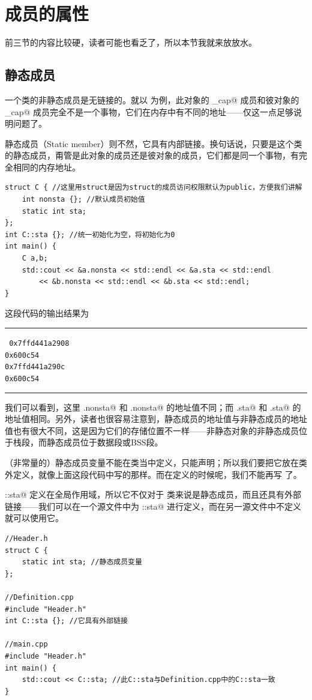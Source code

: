 \section{成员的属性}
前三节的内容比较硬，读者可能也看乏了，所以本节我就来放放水。\par
\subsection*{静态成员}
一个类的非静态成员是无链接的。就以 \lstinline@valarri@ 为例，此对象的 \lstinline@_cap@ 成员和彼对象的 \lstinline@_cap@ 成员完全不是一个事物，它们在内存中有不同的地址——仅这一点足够说明问题了。\par
静态成员（Static member）则不然，它具有内部链接。换句话说，只要是这个类的静态成员，甭管是此对象的成员还是彼对象的成员，它们都是同一个事物，有完全相同的内存地址。
\begin{lstlisting}
struct C { //这里用struct是因为struct的成员访问权限默认为public，方便我们讲解
    int nonsta {}; //默认成员初始值
    static int sta;
};
int C::sta {}; //统一初始化为空，将初始化为0
int main() {
    C a,b;
    std::cout << &a.nonsta << std::endl << &a.sta << std::endl
        << &b.nonsta << std::endl << &b.sta << std::endl;
}
\end{lstlisting}
这段代码的输出结果为\\\noindent\rule{\linewidth}{.2pt}\texttt{
0x7ffd441a2908\\
0x600c54\\
0x7ffd441a290c\\
0x600c54
}\\\noindent\rule{\linewidth}{.2pt}
我们可以看到，这里 \lstinline@a.nonsta@ 和 \lstinline@b.nonsta@ 的地址值不同；而 \lstinline@a.sta@ 和 \lstinline@b.sta@ 的地址值相同。另外，读者也很容易注意到，静态成员的地址值与非静态成员的地址值也有很大不同，这是因为它们的存储位置不一样——非静态对象的非静态成员位于栈段，而静态成员位于数据段或BSS段。\par
（非常量的）静态成员变量不能在类当中定义，只能声明；所以我们要把它放在类外定义，就像上面这段代码中写的那样。而在定义的时候呢，我们不能再写 \lstinline@static@ 了。\par
\lstinline@C::sta@ 定义在全局作用域，所以它不仅对于 \lstinline@C@ 类来说是静态成员，而且还具有外部链接——我们可以在一个源文件中为 \lstinline@C::sta@ 进行定义，而在另一源文件中不定义就可以使用它。
\begin{lstlisting}
//Header.h
struct C {
    static int sta; //静态成员变量
};

//Definition.cpp
#include "Header.h"
int C::sta {}; //它具有外部链接

//main.cpp
#include "Header.h"
int main() {
    std::cout << C::sta; //此C::sta与Definition.cpp中的C::sta一致
}
\end{lstlisting}\par
